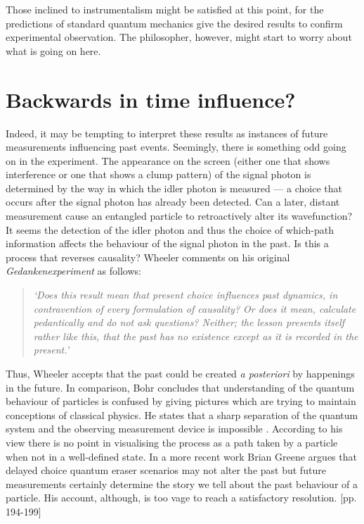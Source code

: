 \documentclass[11pt]{article}
\numberwithin{equation}{section}
\begin{document}
Those inclined to instrumentalism might be satisfied at this point, for the predictions of standard quantum mechanics give the desired results to confirm experimental observation. The philosopher, however, might start to worry about what is going on here. 

\section{Backwards in time influence?}
Indeed, it may be tempting to interpret these results as instances of future measurements influencing past events. Seemingly, there is something odd going on in the experiment. The appearance on the screen (either one that shows interference or one that shows a clump pattern) of the signal photon is determined by the way in which the idler photon is measured --- a choice that occurs after the signal photon has already been detected. Can a later, distant measurement cause an entangled particle to retroactively alter its wavefunction? It seems the detection of the idler photon and thus the choice of which-path information affects the behaviour of the signal photon in the past. Is this a process that reverses causality? Wheeler comments on his original \textit{Gedankenexperiment} as follows:
\begin{quote}
\textit{`Does this result mean that present choice influences past dynamics, in contravention of every formulation of causality? Or does it mean, calculate pedantically and do not ask questions? Neither; the lesson presents itself rather like this, that the past has no existence except as it is recorded in the present.'} \cite{wheeler1978past}
\end{quote}
Thus, Wheeler accepts that the past could be created \textit{a posteriori} by happenings in the future. In comparison, Bohr concludes that understanding of the quantum behaviour of particles is confused by giving pictures which are trying to maintain conceptions of classical physics. He states that a sharp separation of the quantum system and the observing measurement device is impossible \cite{bohr1961atomic}. According to his view there is no point in visualising the process as a path taken by a particle when not in a well-defined state.  In a more recent work Brian Greene argues that delayed choice quantum eraser scenarios may not alter the past but future measurements certainly determine the story we tell about the past behaviour of a particle. His account, although, is too vage to reach a satisfactory resolution.  \cite{brian2004fabric}[pp. 194-199] 
\end{document}
